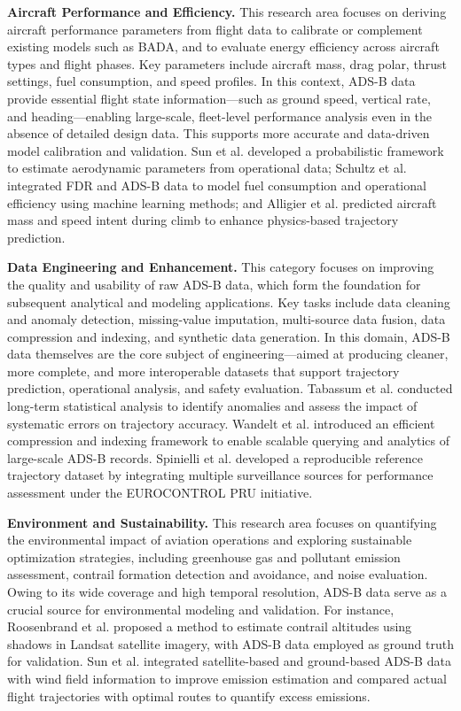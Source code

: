 \textbf{Aircraft Performance and Efficiency.} 
This research area focuses on deriving aircraft performance parameters from flight data to calibrate or complement existing models such as BADA, and to evaluate energy efficiency across aircraft types and flight phases. Key parameters include aircraft mass, drag polar, thrust settings, fuel consumption, and speed profiles.
In this context, ADS-B data provide essential flight state information—such as ground speed, vertical rate, and heading—enabling large-scale, fleet-level performance analysis even in the absence of detailed design data. This supports more accurate and data-driven model calibration and validation.
Sun et al. \cite{sun2018aircraft} developed a probabilistic framework to estimate aerodynamic parameters from operational data; Schultz et al. \cite{schultz2022data} integrated FDR and ADS-B data to model fuel consumption and operational efficiency using machine learning methods; and Alligier et al. \cite{alligier2020predictive} predicted aircraft mass and speed intent during climb to enhance physics-based trajectory prediction.

\textbf{Data Engineering and Enhancement.} 
This category focuses on improving the quality and usability of raw ADS-B data, which form the foundation for subsequent analytical and modeling applications. Key tasks include data cleaning and anomaly detection, missing-value imputation, multi-source data fusion, data compression and indexing, and synthetic data generation. In this domain, ADS-B data themselves are the core subject of engineering—aimed at producing cleaner, more complete, and more interoperable datasets that support trajectory prediction, operational analysis, and safety evaluation.
Tabassum et al. \cite{tabassum2017ads} conducted long-term statistical analysis to identify anomalies and assess the impact of systematic errors on trajectory accuracy. Wandelt et al. \cite{wandelt2018ads} introduced an efficient compression and indexing framework to enable scalable querying and analytics of large-scale ADS-B records. Spinielli et al. \cite{spinielli2017initial} developed a reproducible reference trajectory dataset by integrating multiple surveillance sources for performance assessment under the EUROCONTROL PRU initiative.

\textbf{Environment and Sustainability.}
This research area focuses on quantifying the environmental impact of aviation operations and exploring sustainable optimization strategies, including greenhouse gas and pollutant emission assessment, contrail formation detection and avoidance, and noise evaluation. Owing to its wide coverage and high temporal resolution, ADS-B data serve as a crucial source for environmental modeling and validation. For instance, Roosenbrand et al. \cite{roosenbrand2023contrail} proposed a method to estimate contrail altitudes using shadows in Landsat satellite imagery, with ADS-B data employed as ground truth for validation. Sun et al. \cite{sun2023evaluating} integrated satellite-based and ground-based ADS-B data with wind field information to improve emission estimation and compared actual flight trajectories with optimal routes to quantify excess emissions.

